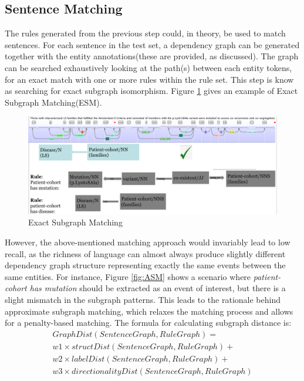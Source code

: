 \subsection{Sentence Matching}
The rules generated from the previous step could, in theory, be used to match sentences. For each sentence in the test set, a dependency graph can be generated together with the entity annotations(these are provided, as discussed). The graph can be searched exhaustively looking at the path(s) between each entity tokens, for an exact match with one or more rules within the rule set. This step is know as searching for exact subgraph isomorphism. Figure \ref{fig:ESM} gives an example of Exact Subgraph Matching(ESM).\newline\newline
\begin{figure}
	\centering
	\includegraphics[width=\textwidth]{ESM}
	\caption{Exact Subgraph Matching}
	\label{fig:ESM}   
\end{figure}
However, the above-mentioned matching approach would invariably lead to low recall, as the richness of language can almost always produce slightly different dependency graph structure representing exactly the same events between the same entities. For instance, Figure \ref{fig:ASM} shows a scenario where \emph{patient-cohort has mutation} should be extracted as an event of interest, but there is a slight mismatch in the subgraph patterns. This leads to the rationale behind approximate subgraph matching, which relaxes the matching process and allows for a penalty-based matching. The formula for calculating subgraph distance is: 
\begin{equation}
\begin{split}
GraphDist(SentenceGraph, RuleGraph) = \\
w1 \times structDist(SentenceGraph, RuleGraph)  +\\ 
w2 \times labelDist(SentenceGraph, RuleGraph)   +\\
w3 \times directionalityDist(SentenceGraph, RuleGraph)\\
\end{split}
\end{equation}
